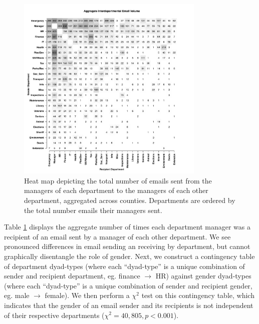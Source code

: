 \documentclass{pnastwo}
\begin{document}
\begin{article}
	\begin{figure}
	\centering
	\includegraphics[width = 0.8\textwidth]{images/Aggregate_Email_Flows.pdf}
	\caption{\label{fig:heatmaps}Heat map depicting the total number of emails sent from the managers of each department to the managers of each other department, aggregated across counties. Departments are ordered by the total number emails their managers sent.}
	\end{figure}

	
	
Table \ref{fig:heatmaps} displays the aggregate number of times each department manager was a recipient of an email sent by a manager of each other department. We see pronounced differences in email sending an receiving by department, but cannot graphically disentangle the role of gender. 
Next, we construct a contingency table of department dyad-types (where each ``dyad-type'' is a unique combination of sender and recipient department, eg. finance $\longrightarrow$ HR) against gender dyad-types (where each ``dyad-type'' is a unique combination of sender and recipient gender, eg. male $\longrightarrow$ female).  We then perform a $\chi^2$ test on this contingency table, which indicates that the gender of an email sender and its recipients is not independent of their respective departments ($\chi^2 = 40,805, p < 0.001$).
	

\end{article}
\end{document}
